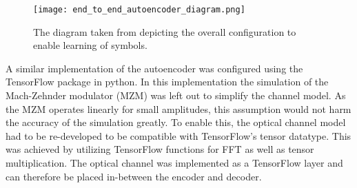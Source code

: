         \begin{figure}[H]
    		\centering
    		\texttt{[image: end\_to\_end\_autoencoder\_diagram.png]}
    		\caption{The diagram taken from \autocite{8433895} depicting the overall configuration to enable learning of symbols.}
    		\label{fig:end_to_end_autoencoder_diagram}	
    	\end{figure}
        
        A similar implementation of the autoencoder was configured using the TensorFlow package in python. In this implementation the simulation of the Mach-Zehnder modulator (MZM) was left out to simplify the channel model. As the MZM operates linearly for small amplitudes, this assumption would not harm the accuracy of the simulation greatly. To enable this, the optical channel model had to be re-developed to be compatible with TensorFlow's tensor datatype. This was achieved by utilizing TensorFlow functions for FFT as well as tensor multiplication. The optical channel was implemented as a TensorFlow layer and can therefore be placed in-between the encoder and decoder.
        \\
    

